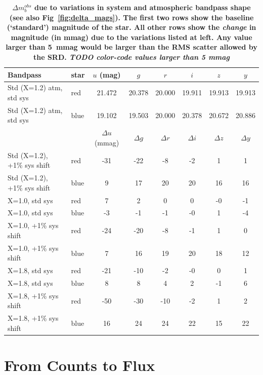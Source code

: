 \documentclass[12pt,preprint]{aastex}
\begin{document}
\begin{center}
\begin{table}[htb]
\caption{{\bf $\Delta m_b^{obs}$ due to variations in system and atmospheric
 bandpass shape (see also Fig~\ref{fig:delta_mags}). The first two
rows show the baseline (`standard') magnitude of the star. All other rows show the 
{\it change} in magnitude (in mmag) due to the variations listed at
left. Any value larger than 5~mmag would be larger than the RMS
scatter allowed by the SRD. {\it TODO color-code values larger than 5 mmag}} }
\begin{tabular}{l l | c c c c c c}
Bandpass & star &  $u$ (mag) & $g$ & $r$ & $i$ & $z$ & $y$ \\ \hline
Std (X=1.2) atm, std sys  &  red & 21.472 & 20.378 & 20.000 & 19.911 & 19.913 & 19.913 \\
Std (X=1.2) atm, std sys  &  blue & 19.102 & 19.503 & 20.000 & 20.378 & 20.672 & 20.886 \\ \hline \hline
 & & $\Delta u$ (mmag) & $\Delta g$  & $\Delta r$  & $\Delta i$ & $\Delta z$  & $\Delta y$ \\ \hline
Std (X=1.2), +1\% sys shift & red  & -31 & -22 & -8 & -2 & 1 & 1 \\
Std (X=1.2), +1\% sys shift & blue  & 9 & 17 & 20 & 20 & 16 & 16 \\ \hline
X=1.0, std sys & red  & 7 & 2 & 0 & 0 & -0 & -1 \\
X=1.0, std sys & blue  & -3 & -1 & -1 & -0 & 1 & -4 \\ \hline
X=1.0, +1\% sys shift & red & -24 & -20 & -8 & -1 & 1 & 0 \\
X=1.0, +1\% sys shift & blue & 7 & 16 & 19 & 20 & 18 & 12 \\ \hline
X=1.8, std sys  & red & -21 & -10 & -2 & -0 & 0 & 1 \\
X=1.8, std sys  & blue & 8 & 8 & 4 & 2 & -1 & 6 \\ \hline
X=1.8, +1\% sys shift & red & -50 & -30 & -10 & -2 & 1 & 2 \\
X=1.8, +1\% sys shift & blue & 16 & 24 & 24 & 22 & 15 & 22 \\ \hline
\end{tabular}
\label{tab:delta_mags}
\end{table}
\end{center}

\section{From Counts to Flux}
\label{sec:counts2photons}
\end{document}
